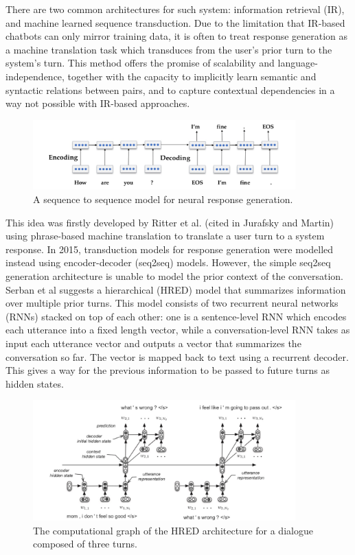 \documentclass[bsc,frontabs,twoside,singlespacing,parskip,deptreport]{infthesis}     %
\begin{document}
There are two common architectures for such system:  information retrieval (IR), and machine learned sequence transduction. Due to the limitation that IR-based chatbots can only mirror training data, it is often to treat response generation as a machine translation task which transduces from the user’s prior turn to the system’s turn. This method offers the promise of scalability and language-independence, together with the capacity to implicitly learn semantic and syntactic relations between pairs, and to capture contextual dependencies in a way not possible with IR-based approaches.

\begin{figure}[h]
    \centering
    \includegraphics[width=0.9\textwidth]{seq2seq.jpeg}
    \caption{A sequence to sequence model for neural response generation.\cite{jurafsky2019speech}}
    \label{fig:seq2seq}
\end{figure}

This idea was firstly developed by Ritter et al\cite{ritter2011data}. (cited in Jurafsky and Martin\cite{jurafsky2019speech}) using phrase-based machine translation to translate a user turn to a system response. In 2015, transduction models for response generation were modelled instead using encoder-decoder (seq2seq) models\cite{shang2015neural,strub2017end,sordoni2015neural}. However, the simple seq2seq generation architecture is unable to model the prior context of the conversation. Serban et al\cite{serban2016building} suggests a hierarchical (HRED) model that summarizes information over multiple prior turns. This model consists of two recurrent neural networks (RNNs) stacked on top of each other: one is a sentence-level RNN which encodes each utterance into a fixed length vector, while a conversation-level RNN takes as input each utterance vector and outputs a vector that summarizes the conversation so far. The vector is mapped back to text using a recurrent decoder. This gives a way for the previous information to be passed to future turns as hidden states\cite{lowe2017training}.

\begin{figure}[h]
    \centering
    \includegraphics[width=0.9\textwidth]{HERD.jpeg}
    \caption{The computational graph of the HRED architecture for a dialogue composed of three turns.}
    \label{fig:HERD}
\end{figure}
\end{document}
